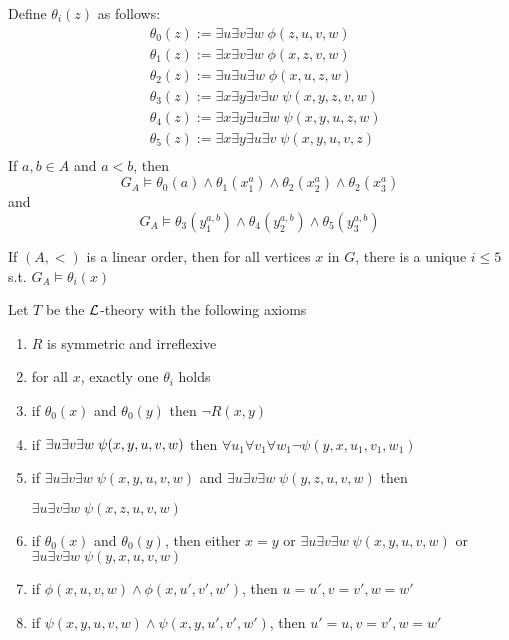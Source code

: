 \documentclass[11pt]{article}
\begin{document}
Define \(\theta_i(z)\) as follows:
\begin{align*}
&\theta_0(z):=\exists u\exists v\exists w\;\phi(z,u,v,w)\\
&\theta_1(z):=\exists x\exists v\exists w\;\phi(x,z,v,w)\\
&\theta_2(z):=\exists u\exists u\exists w\;\phi(x,u,z,w)\\
&\theta_3(z):=\exists x\exists y\exists v\exists w\;\psi(x,y,z,v,w)\\
&\theta_4(z):=\exists x\exists y\exists u\exists w\;\psi(x,y,u,z,w)\\
&\theta_5(z):=\exists x\exists y\exists u\exists v\;\psi(x,y,u,v,z)\\
\end{align*}
If \(a,b\in A\) and \(a<b\), then
\begin{equation*}
G_A\models\theta_0(a)\wedge\theta_1(x^a_1)\wedge\theta_2(x^a_2)\wedge
\theta_2(x^a_3)
\end{equation*}
and 
\begin{equation*}
G_A\models\theta_3(y_1^{a,b})\wedge\theta_4(y_2^{a,b})\wedge\theta_5(
y_3^{a,b})
\end{equation*}
\begin{lemma}[]
If \((A,<)\) is a linear order, then for all vertices \(x\) in \(G\), there is a
unique \(i\le 5\) s.t. \(G_A\models\theta_i(x)\)
\end{lemma}

Let \(T\) be the \(\mathcal{L}\)-theory with the following axioms
\begin{enumerate}
\item \(R\) is symmetric and irreflexive
\item for all \(x\), exactly one \(\theta_i\) holds
\item if \(\theta_0(x)\) and \(\theta_0(y)\) then \(\neg R(x,y)\)
\item if \(\exists u\exists v\exists w\;\psi(x,y,u,v,w)\\\) then
\(\forall u_1\forall v_1\forall w_1\neg\psi(y,x,u_1,v_1,w_1)\)
\item if \(\exists u\exists v\exists w\;\psi(x,y,u,v,w)\) and 
\(\exists u\exists v\exists w\;\psi(y,z,u,v,w)\) then\par
\(\exists u\exists v\exists w\;\psi(x,z,u,v,w)\)
\item if \(\theta_0(x)\) and \(\theta_0(y)\), then either \(x=y\) or 
\(\exists u\exists v\exists w\;\psi(x,y,u,v,w)\) or
\(\exists u\exists v\exists w\;\psi(y,x,u,v,w)\)
\item if \(\phi(x,u,v,w)\wedge\phi(x,u',v',w')\), then
\(u=u',v=v',w=w'\)
\item if \(\psi(x,y,u,v,w)\wedge\psi(x,y,u',v',w')\), then
\(u'=u,v=v',w=w'\)
\end{enumerate}
\end{document}

